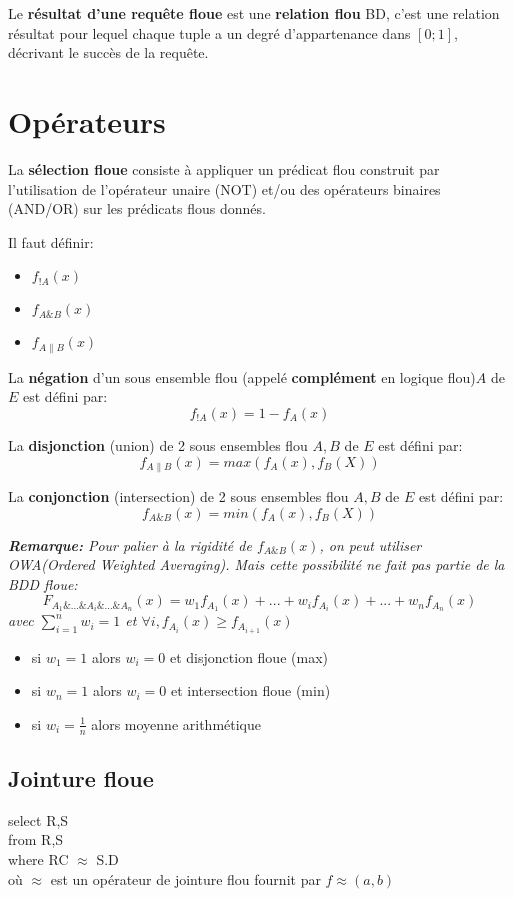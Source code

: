 \documentclass[a4paper,11pt]{article}
\begin{document}
Le \textbf{résultat d'une requête floue} est une \textbf{relation flou} BD, c'est une relation résultat pour lequel chaque tuple a un degré d'appartenance dans $[0;1]$, décrivant le succès de la requête.

\section{Opérateurs}
La \textbf{sélection floue} consiste à appliquer un prédicat flou construit par l’utilisation de l'opérateur unaire (NOT) et/ou des opérateurs binaires (AND/OR) sur les prédicats flous donnés.

\par Il faut définir:
\begin{itemize}
\item$f_{!A}(x)$
\item$f_{A\&B}(x)$
\item$f_{A\|B}(x)$
\end{itemize} 

La \textbf{négation} d'un sous ensemble flou (appelé \textbf{complément} en logique flou)$A$ de $E$ est défini par:$$f_{!A}(x)=1-f_A(x)$$

La \textbf{disjonction} (union) de 2 sous ensembles flou $A,B$ de $E$ est défini par:
$$f_{A\|B}(x)=max(f_A(x),f_B(X))$$

La \textbf{conjonction} (intersection) de 2 sous ensembles flou $A,B$ de $E$ est défini par:
$$f_{A\&B}(x)=min(f_A(x),f_B(X))$$

\emph{\textbf{Remarque:}
Pour palier à la rigidité de $f_{A\&B}(x)$, on peut utiliser OWA(Ordered Weighted Averaging). Mais cette possibilité ne fait pas partie de la BDD floue:
$$ F_{A_1\&...\&A_i\&...\&A_n}(x)=w_1f_{A_1}(x)+...+w_if_{A_i}(x)+...+w_nf_{A_n}(x)$$
avec $\sum_{i=1}^{n} w_i=1$ et $\forall i,f_{A_i}(x)\geq f_{A_{i+1}}(x)$
}
\begin{itemize}
\item si $w_1=1$ alors $w_i=0$ et disjonction floue (max)
\item si $w_n=1$ alors $w_i=0$ et intersection floue (min)
\item si $w_i=\frac{1}{n}$ alors moyenne arithmétique
\end{itemize}


\subsection{Jointure floue}
 
\begin{flushleft}
select R,S\\
from R,S\\
where RC $\approx$ S.D\\
où $\approx$ est un opérateur de jointure flou fournit par $f \approx (a,b)$ 
\end{flushleft}
\end{document}
